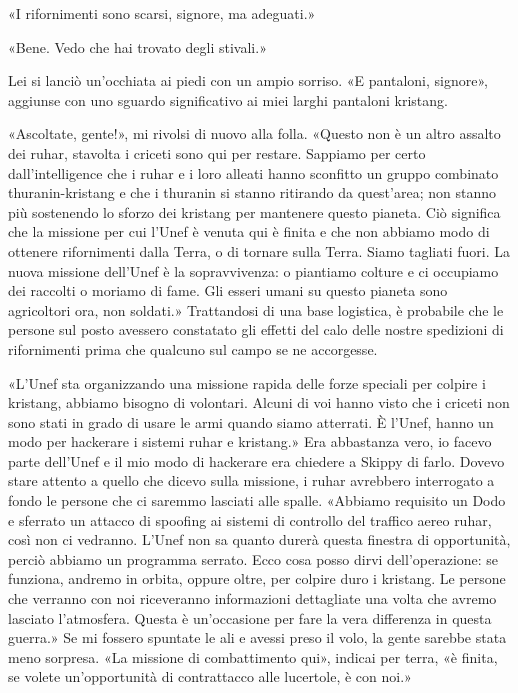 «I rifornimenti sono scarsi, signore, ma adeguati.»

«Bene. Vedo che hai trovato degli stivali.»

Lei si lanciò un'occhiata ai piedi con un ampio sorriso. «E pantaloni,
signore», aggiunse con uno sguardo significativo ai miei larghi
pantaloni kristang.

«Ascoltate, gente!», mi rivolsi di nuovo alla folla. «Questo non è un
altro assalto dei ruhar, stavolta i criceti sono qui per restare.
Sappiamo per certo dall'intelligence che i ruhar e i loro alleati hanno
sconfitto un gruppo combinato thuranin-kristang e che i thuranin si
stanno ritirando da quest'area; non stanno più sostenendo lo sforzo dei
kristang per mantenere questo pianeta. Ciò significa che la missione per
cui l'Unef è venuta qui è finita e che non abbiamo modo di ottenere
rifornimenti dalla Terra, o di tornare sulla Terra. Siamo tagliati
fuori. La nuova missione dell'Unef è la sopravvivenza: o piantiamo
colture e ci occupiamo dei raccolti o moriamo di fame. Gli esseri umani
su questo pianeta sono agricoltori ora, non soldati.» Trattandosi di una
base logistica, è probabile che le persone sul posto avessero constatato
gli effetti del calo delle nostre spedizioni di rifornimenti prima che
qualcuno sul campo se ne accorgesse.

«L'Unef sta organizzando una missione rapida delle forze speciali per
colpire i kristang, abbiamo bisogno di volontari. Alcuni di voi hanno
visto che i criceti non sono stati in grado di usare le armi quando
siamo atterrati. È l'Unef, hanno un modo per hackerare i sistemi ruhar e
kristang.» Era abbastanza vero, io facevo parte dell'Unef e il mio modo
di hackerare era chiedere a Skippy di farlo. Dovevo stare attento a
quello che dicevo sulla missione, i ruhar avrebbero interrogato a fondo
le persone che ci saremmo lasciati alle spalle. «Abbiamo requisito un
Dodo e sferrato un attacco di spoofing ai sistemi di controllo del
traffico aereo ruhar, così non ci vedranno. L'Unef non sa quanto durerà
questa finestra di opportunità, perciò abbiamo un programma serrato.
Ecco cosa posso dirvi dell'operazione: se funziona, andremo in orbita,
oppure oltre, per colpire duro i kristang. Le persone che verranno con
noi riceveranno informazioni dettagliate una volta che avremo lasciato
l'atmosfera. Questa è un'occasione per fare la vera differenza in questa
guerra.» Se mi fossero spuntate le ali e avessi preso il volo, la gente
sarebbe stata meno sorpresa. «La missione di combattimento qui», indicai
per terra, «è finita, se volete un'opportunità di contrattacco alle
lucertole, è con noi.»

